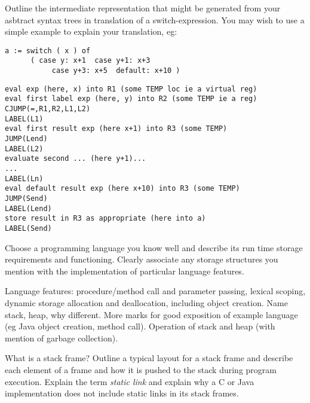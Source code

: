 \documentclass[11pt]{cityexam}
\begin{document}
\begin{questions}
\begin{subquestions}
\subquestion
        Outline the intermediate representation
        that might be generated from your
        asbtract syntax trees in translation of
        a switch-expression.
        You may wish to use a simple example to explain your 
        translation, eg:
\begin{verbatim}
a := switch ( x ) of 
      ( case y: x+1  case y+1: x+3  
           case y+3: x+5  default: x+10 )
\end{verbatim}

\begin{modelanswer}
\begin{verbatim}
eval exp (here, x) into R1 (some TEMP loc ie a virtual reg)
eval first label exp (here, y) into R2 (some TEMP ie a reg)
CJUMP(=,R1,R2,L1,L2)
LABEL(L1)
eval first result exp (here x+1) into R3 (some TEMP)
JUMP(Lend)
LABEL(L2)
evaluate second ... (here y+1)...
...
LABEL(Ln)
eval default result exp (here x+10) into R3 (some TEMP)
JUMP(Send)
LABEL(Lend)
store result in R3 as appropriate (here into a)
LABEL(Send)
\end{verbatim}
\end{modelanswer}

\end{subquestions}

\newpage

\question


\begin{subquestions}

\subquestion
Choose a programming language you know well and describe
its run time storage requirements and functioning.
Clearly associate any storage structures you
mention with the implementation of particular 
language features.

\begin{modelanswer}
Language features: procedure/method call and parameter passing,
lexical scoping, dynamic storage allocation and deallocation,
including object creation. Name stack, heap, why different.
More marks for good exposition of example language
(eg Java object creation, method call). Operation of
stack and heap (with mention of garbage collection).
\end{modelanswer}


\subquestion
What is a stack frame?
Outline a typical layout for a stack frame and describe 
each element of a frame and how it is pushed to the stack during
program execution. 
Explain the term {\em static link\/} and explain why a C or Java
implementation does not include static links in its stack frames.


\end{subquestions}
\end{questions}
\end{document}
